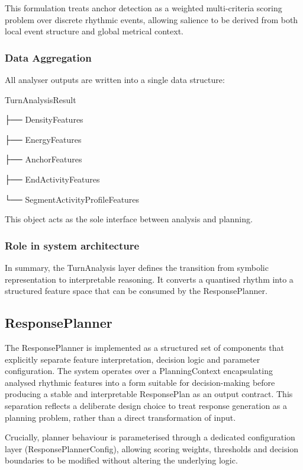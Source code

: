 This formulation treats anchor detection as a weighted multi-criteria
scoring problem over discrete rhythmic events, allowing salience to be
derived from both local event structure and global metrical context.

\subsubsection{Data Aggregation}\label{data-aggregation}

All analyser outputs are written into a single data structure:

TurnAnalysisResult

├── DensityFeatures

├── EnergyFeatures

├── AnchorFeatures

├── EndActivityFeatures

└── SegmentActivityProfileFeatures

This object acts as the sole interface between analysis and planning.

\subsubsection{Role in system architecture}\label{role-in-system-architecture-3}

In summary, the TurnAnalysis layer defines the transition from symbolic
representation to interpretable reasoning. It converts a quantised
rhythm into a structured feature space that can be consumed by the
ResponsePlanner.

\subsection{ResponsePlanner}\label{responseplanner}

The ResponsePlanner is implemented as a structured set of components
that explicitly separate feature interpretation, decision logic and
parameter configuration. The system operates over a PlanningContext
encapsulating analysed rhythmic features into a form suitable for
decision-making before producing a stable and interpretable ResponsePlan
as an output contract. This separation reflects a deliberate design
choice to treat response generation as a planning problem, rather than a
direct transformation of input.

Crucially, planner behaviour is parameterised through a dedicated
configuration layer (ResponsePlannerConfig), allowing scoring weights,
thresholds and decision boundaries to be modified without altering the
underlying logic.

